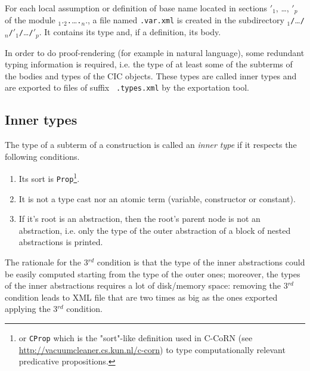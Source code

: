 For each local assumption or definition of base name {\ident} located
in sections {\ident$'_1$}, {\ldots}, {\ident$'_p$} of the module
{\ident$_1$}.{\ident$_2$}{\tt .}{\ldots}{\tt .}{\ident$_n$}.{\ident}, a file
named {\tt {\ident}.var.xml} is created in the subdirectory
{\ident$_1$}{\tt /}{\ldots}{\tt /}{\ident$_n$}{\tt /}{\ident$'_1$}{\tt /}\ldots{\tt /}{\ident$'_p$}.
It contains its type and, if a definition, its body.

In order to do proof-rendering (for example in natural language), some
redundant typing information is required, i.e. the type of at least
some of the subterms of the bodies and types of the CIC objects. These
types are called inner types and are exported to files of suffix {\tt
.types.xml} by the exportation tool.




\subsection[Inner types]{Inner types\label{inner-types}}

The type of a subterm of a construction is called an {\em inner type}
if it respects the following conditions.
 
\begin{enumerate}
  \item Its sort is \verb+Prop+\footnote{or {\tt CProp} which is the
    "sort"-like definition used in C-CoRN (see
    \url{http://vacuumcleaner.cs.kun.nl/c-corn}) to type
    computationally relevant predicative propositions.}.
 \item It is not a type cast nor an atomic term (variable, constructor or constant).
 \item If it's root is an abstraction, then the root's parent node is
    not an abstraction, i.e. only the type of the outer abstraction of
    a block of nested abstractions is printed.
\end{enumerate}
                                                                               
The rationale for the 3$^{rd}$ condition is that the type of the inner
abstractions could be easily computed starting from the type of the
outer ones; moreover, the types of the inner abstractions requires a
lot of disk/memory space: removing the 3$^{rd}$ condition leads to XML
file that are two times as big as the ones exported applying the 3$^{rd}$
condition.

